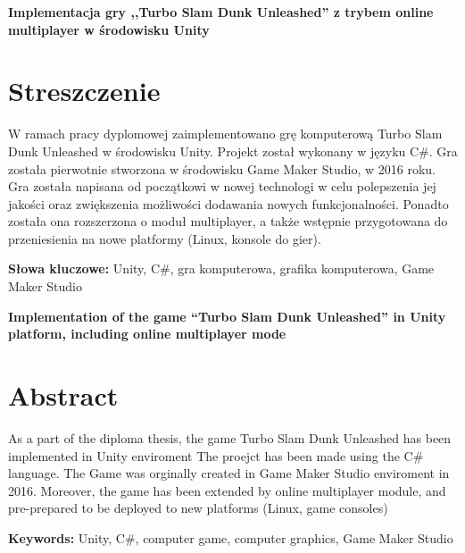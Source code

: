 \newpage
\begin{center}
\large \bf
Implementacja gry ,,Turbo Slam Dunk Unleashed'' z trybem online multiplayer w środowisku Unity
\end{center}

\section*{Streszczenie}
W ramach pracy dyplomowej zaimplementowano grę komputerową Turbo Slam Dunk Unleashed w środowisku Unity. Projekt został wykonany w języku C\#. Gra została pierwotnie stworzona w środowisku Game Maker Studio, w 2016 roku.
Gra została napisana od początkowi w nowej technologi w celu polepszenia jej jakości oraz zwiększenia możliwości dodawania nowych funkcjonalności. Ponadto została ona rozszerzona o moduł multiplayer, a także wstępnie przygotowana do przeniesienia na nowe platformy (Linux, konsole do gier).

\bigskip
{\noindent\bf Słowa kluczowe:} Unity, C\#, gra komputerowa, grafika komputerowa, Game Maker Studio

\vskip 2cm



\newpage
\begin{center}
\large \bf
Implementation of the game ``Turbo Slam Dunk Unleashed'' in Unity platform, including online multiplayer mode 
\end{center}

\section*{Abstract}
As a part of the diploma thesis, the game Turbo Slam Dunk Unleashed has been implemented in Unity enviroment The proejct has been made using the C\# language. The Game was orginally created in Game Maker Studio enviroment in 2016. Moreover, the game has been extended by online multiplayer module, and pre-prepared to be deployed to new platforms (Linux, game consoles)

\bigskip
{\noindent\bf Keywords:} Unity, C\#, computer game, computer graphics, Game Maker Studio

\vfill